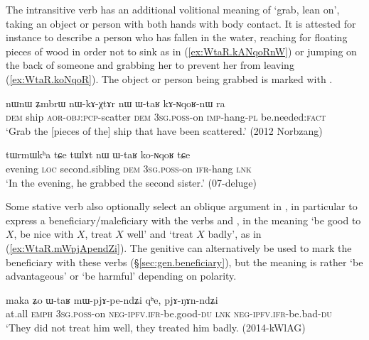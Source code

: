 The intransitive verb  has an additional volitional meaning of `grab, lean on', taking an object or person with both hands with body contact. It is attested for instance to describe a person who has fallen in the water, reaching for floating pieces of wood in order not to sink as in (\ref{ex:WtaR.kANqoRnW}) or jumping on the back of someone and grabbing her to prevent her from leaving (\ref{ex:WtaR.koNqoR}). The object or person being grabbed is marked with .

\begin{exe}
\ex \label{ex:WtaR.kANqoRnW}
 \gll nɯnɯ ʑmbrɯ nɯ-kɤ-χtɤr nɯ ɯ-taʁ kɤ-ɴqoʁ-nɯ ra   \\
 \textsc{dem} ship \textsc{aor}-\textsc{obj}:\textsc{pcp}-scatter \textsc{dem} \textsc{3sg}.\textsc{poss}-on \textsc{imp}-hang-\textsc{pl} be.needed:\textsc{fact} \\
 \glt `Grab the [pieces of the] ship that have been scattered.' (2012 Norbzang)
\end{exe}

\begin{exe}
\ex \label{ex:WtaR.koNqoR}
\gll tɯrmɯkʰa tɕe tɯlɤt nɯ ɯ-taʁ ko-ɴqoʁ tɕe \\
evening \textsc{loc} second.sibling \textsc{dem} \textsc{3sg}.\textsc{poss}-on \textsc{ifr}-hang \textsc{lnk} \\
\glt `In the evening, he grabbed the second sister.' (07-deluge) 
\end{exe} 

Some stative verb also optionally select an oblique argument in , in particular to express a beneficiary/maleficiary with the verbs  and , in the meaning `be good to $X$, be nice with $X$, treat $X$ well' and `treat $X$ badly', as in (\ref{ex:WtaR.mWpjApendZi}). The genitive can alternatively be used to mark the beneficiary with these verbs (§\ref{sec:gen.beneficiary}), but the meaning is rather `be advantageous' or `be harmful' depending on polarity.


\begin{exe}
\ex \label{ex:WtaR.mWpjApendZi}
\gll  maka ʑo ɯ-taʁ mɯ-pjɤ-pe-ndʑi qʰe, pjɤ-ŋɤn-ndʑi \\
at.all \textsc{emph} \textsc{3sg}.\textsc{poss}-on \textsc{neg}-\textsc{ipfv}.\textsc{ifr}-be.good-\textsc{du} \textsc{lnk} \textsc{neg}-\textsc{ipfv}.\textsc{ifr}-be.bad-\textsc{du} \\
\glt `They did not treat him well, they treated him badly. (2014-kWlAG)
\end{exe}

